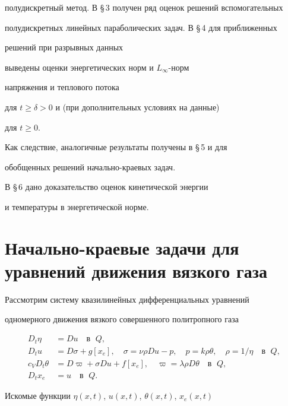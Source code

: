 полудискретный метод. В \S\,3 получен ряд оценок решений вспомогательных


полудискретных линейных параболических задач. В \S\,4 для приближенных


решений при разрывных данных


выведены оценки энергетических норм и $L_\infty$-норм


напряжения и теплового потока


для $t\ge\delta>0$ и (при дополнительных условиях на данные)


для $t\ge 0$.


Как следствие, аналогичные результаты получены в \S\,5 и для


обобщенных решений начально-краевых задач.


В \S\,6 дано доказательство оценок кинетической энергии


и температуры в энергетической норме.





\section{Начально-краевые задачи для уравнений движения вязкого газа}





Рассмотрим систему квазилинейных дифференциальных уравнений


одномерного движения вязкого совершенного политропного газа


\begin{align}


D_t\eta&=Du \quad \text{в }\; Q,\\


D_tu&=D\sigma+g[x_e],\quad


\sigma=\nu\rho Du-p,\quad p=k\rho\theta,\quad \rho=1/\eta\quad


\text {в }\; Q,\\


c_V D_t\theta&=D\varpi+\sigma Du+f[x_e],


\quad \varpi= \lambda\rho D\theta


\quad \text {в }\; Q,\\


D_tx_e&=u\quad \text {в }\; Q.


\end{align}


Искомые функции $\eta(x,t)$, $u(x,t)$, $\theta(x,t)$, $x_e(x,t)$


